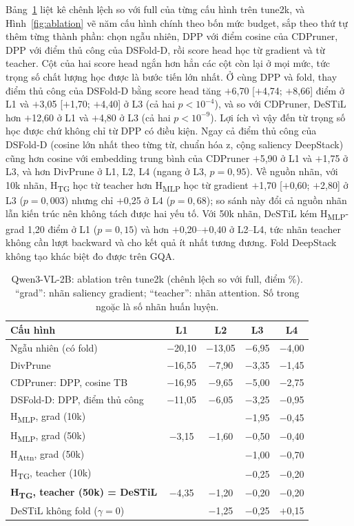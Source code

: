 \documentclass[conference]{IEEEtran}
\newcommand{\mi}{\ensuremath{-}}            %
\newcommand{\pl}{\ensuremath{+}}
\newcommand{\Hmlp}{H\textsubscript{MLP}}
\newcommand{\Hattn}{H\textsubscript{Attn}}
\newcommand{\Htg}{H\textsubscript{TG}}
\begin{document}
Bảng~\ref{tab:ablation} liệt kê chênh lệch so với full của từng cấu hình trên tune2k, và Hình~\ref{fig:ablation} vẽ năm cấu hình chính theo bốn mức budget, sắp theo thứ tự thêm từng thành phần: chọn ngẫu nhiên, DPP với điểm cosine của CDPruner, DPP với điểm thủ công của DSFold-D, rồi score head học từ gradient và từ teacher. Cột của hai score head ngắn hơn hẳn các cột còn lại ở mọi mức, tức trọng số chất lượng học được là bước tiến lớn nhất. Ở cùng DPP và fold, thay điểm thủ công của DSFold-D bằng score head tăng \pl6,70 [\pl4,74; \pl8,66] điểm ở L1 và \pl3,05 [\pl1,70; \pl4,40] ở L3 (cả hai $p<10^{-4}$), và so với CDPruner, DeSTiL hơn \pl12,60 ở L1 và \pl4,80 ở L3 (cả hai $p<10^{-9}$). Lợi ích vì vậy đến từ trọng số học được chứ không chỉ từ DPP có điều kiện. Ngay cả điểm thủ công của DSFold-D (cosine lớn nhất theo từng từ, chuẩn hóa z, cộng saliency DeepStack) cũng hơn cosine với embedding trung bình của CDPruner \pl5,90 ở L1 và \pl1,75 ở L3, và hơn DivPrune ở L1, L2, L4 (ngang ở L3, $p=0{,}95$). Về nguồn nhãn, với 10k nhãn, \Htg{} học từ teacher hơn \Hmlp{} học từ gradient \pl1,70 [\pl0,60; \pl2,80] ở L3 ($p=0{,}003$) nhưng chỉ \pl0,25 ở L4 ($p=0{,}68$); so sánh này đổi cả nguồn nhãn lẫn kiến trúc nên không tách được hai yếu tố. Với 50k nhãn, DeSTiL kém \Hmlp-grad 1,20 điểm ở L1 ($p=0{,}15$) và hơn \pl0,20--\pl0,40 ở L2--L4, tức nhãn teacher không cần lượt backward và cho kết quả ít nhất tương đương. Fold DeepStack không tạo khác biệt đo được trên GQA.

\begin{table}[!t]
\centering
\caption{Qwen3-VL-2B: ablation trên tune2k (chênh lệch so với full, điểm \%). ``grad'': nhãn saliency gradient; ``teacher'': nhãn attention. Số trong ngoặc là số nhãn huấn luyện.}
\label{tab:ablation}
\setlength{\tabcolsep}{3.5pt}
\begin{tabular}{@{}lcccc@{}}
\toprule
Cấu hình & L1 & L2 & L3 & L4\\
\midrule
Ngẫu nhiên (có fold) & \mi20,10 & \mi13,05 & \mi6,95 & \mi4,00\\
DivPrune & \mi16,55 & \mi7,90 & \mi3,35 & \mi1,45\\
CDPruner: DPP, cosine TB & \mi16,95 & \mi9,65 & \mi5,00 & \mi2,75\\
DSFold-D: DPP, điểm thủ công & \mi11,05 & \mi6,05 & \mi3,25 & \mi0,95\\
\midrule
\Hmlp, grad (10k) & & & \mi1,95 & \mi0,45\\
\Hmlp, grad (50k) & \mi3,15 & \mi1,60 & \mi0,50 & \mi0,40\\
\Hattn, grad (50k) & & & \mi1,00 & \mi0,70\\
\Htg, teacher (10k) & & & \mi0,25 & \mi0,20\\
\textbf{\Htg, teacher (50k) = DeSTiL} & \mi4,35 & \mi1,20 & \mi0,20 & \mi0,20\\
DeSTiL không fold ($\gamma=0$) & & \mi1,25 & \mi0,25 & \pl0,15\\
\bottomrule
\end{tabular}
\end{table}
\end{document}

